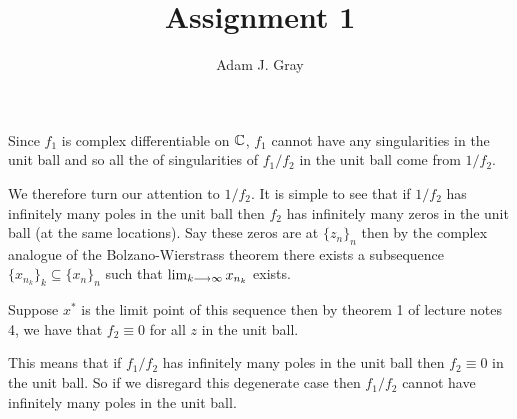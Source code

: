 \documentclass{unswmaths}
\begin{document}
\author{Adam J. Gray}
\title{Assignment 1}
\subject{Complex Analysis}

\newcommand{\llra}{\Leftrightarrow}

\unswtitle

\section{}
\section{}
Since $ f_1 $ is complex differentiable on $ \mathbb{C} $, $ f_1 $ cannot have any singularities in the unit ball and so all the of singularities of $f_1 / f_2 $ in the unit ball come from $ 1/ f_2 $. 

We therefore turn our attention to $ 1 / f_2 $. It is simple to see that if $ 1/f_2 $ has infinitely many poles in the unit ball then $ f_2 $ has infinitely many zeros in the unit ball (at the same locations). Say these zeros are at $ \{ z_n \}_n $ then by the complex analogue of the Bolzano-Wierstrass theorem there exists a subsequence $ \{ x_{n_k} \}_k \subseteq \{ x_n \}_n $ such that $ \lim_{k\longrightarrow\infty} x_{n_k} $ exists. 

Suppose $ x^* $ is the limit point of this sequence then by theorem 1 of lecture notes 4, we have that $ f_2 \equiv 0 $ for all $ z $ in the unit ball. 

This means that if $ f_1 / f_2 $ has infinitely many poles in the unit ball then $ f_2 \equiv 0 $ in the unit ball. So if we disregard this degenerate case then $ f_1 / f_2 $ cannot have infinitely many poles in the unit ball.

\section{}
\end{document}
